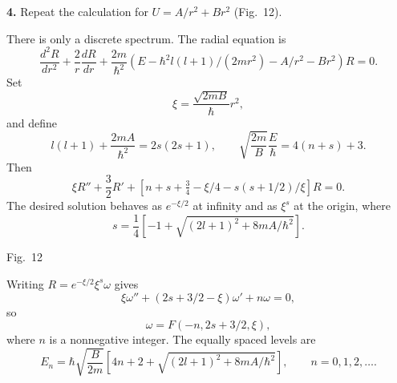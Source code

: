 \textbf{4.} Repeat the calculation for $U=A/r^2+Br^2$ (Fig.~12).

\SolutionHeading There is only a discrete spectrum. The radial equation is
\[
 \frac{d^2R}{dr^2}+\frac2r\frac{dR}{dr}+\frac{2m}{\hbar^2}
 (E-\hbar^2l(l+1)/(2mr^2)-A/r^2-Br^2)R=0.
\]
Set
\[\xi=\frac{\sqrt{2mB}}\hbar r^2,\]
and define
\[l(l+1)+\frac{2mA}{\hbar^2}=2s(2s+1),\qquad
 \sqrt{\frac{2m}{B}}\frac E\hbar=4(n+s)+3.\]
Then
\[
 \xi R''+\frac32R'+[n+s+\tfrac34-\xi/4-s(s+1/2)/\xi]R=0.
\]
The desired solution behaves as $e^{-\xi/2}$ at infinity and as $\xi^s$ at
the origin, where
\[s=\frac14[-1+\sqrt{(2l+1)^2+8mA/\hbar^2}].\]

\begin{center}

\small Fig.~12
\end{center}

Writing $R=e^{-\xi/2}\xi^s\omega$ gives
\[\xi\omega''+(2s+3/2-\xi)\omega'+n\omega=0,\]
so
\[\omega=F(-n,2s+3/2,\xi),\]
where $n$ is a nonnegative integer. The equally spaced levels are
\[
 E_n=\hbar\sqrt{\frac B{2m}}
 [4n+2+\sqrt{(2l+1)^2+8mA/\hbar^2}],\qquad n=0,1,2,\ldots.
\]
